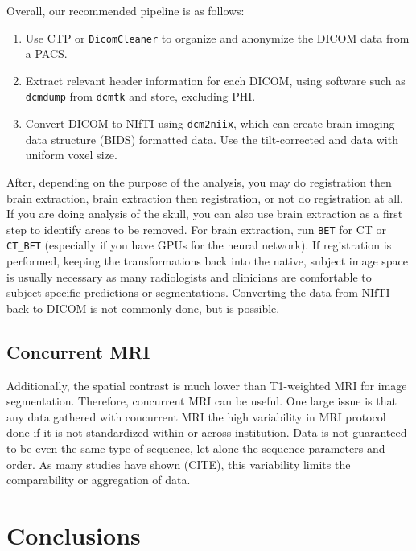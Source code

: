 \documentclass[]{elsarticle} %
\providecommand{\tightlist}{%
  \setlength{\itemsep}{0pt}\setlength{\parskip}{0pt}}
\begin{document}
Overall, our recommended pipeline is as follows:

\begin{enumerate}
\def\labelenumi{\arabic{enumi}.}
\tightlist
\item
  Use CTP or \texttt{DicomCleaner} to organize and anonymize the DICOM data from a PACS.
\item
  Extract relevant header information for each DICOM, using software such as \texttt{dcmdump} from \texttt{dcmtk} and store, excluding PHI.
\item
  Convert DICOM to NIfTI using \texttt{dcm2niix}, which can create brain imaging data structure (BIDS) formatted data. Use the tilt-corrected and data with uniform voxel size.
\end{enumerate}

After, depending on the purpose of the analysis, you may do registration then brain extraction, brain extraction then registration, or not do registration at all. If you are doing analysis of the skull, you can also use brain extraction as a first step to identify areas to be removed. For brain extraction, run \texttt{BET} for CT or \texttt{CT\_BET} (especially if you have GPUs for the neural network). If registration is performed, keeping the transformations back into the native, subject image space is usually necessary as many radiologists and clinicians are comfortable to subject-specific predictions or segmentations. Converting the data from NIfTI back to DICOM is not commonly done, but is possible.

\hypertarget{concurrent-mri}{%
\subsection{Concurrent MRI}\label{concurrent-mri}}

Additionally, the spatial contrast is much lower than T1-weighted MRI for image segmentation. Therefore, concurrent MRI can be useful. One large issue is that any data gathered with concurrent MRI the high variability in MRI protocol done if it is not standardized within or across institution. Data is not guaranteed to be even the same type of sequence, let alone the sequence parameters and order. As many studies have shown (CITE), this variability limits the comparability or aggregation of data.

\hypertarget{conclusions}{%
\section{Conclusions}\label{conclusions}}
\end{document}
